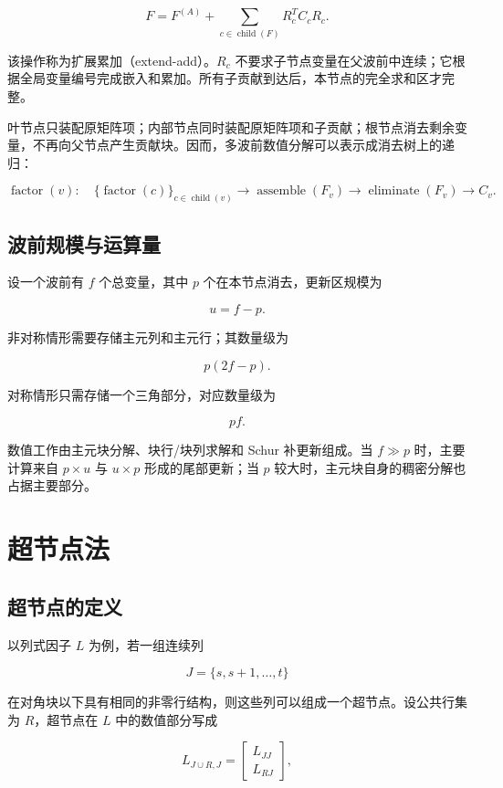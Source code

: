 \[
F=F^{(A)}+
\sum_{c\in\operatorname{child}(F)}R_c^TC_cR_c.
\]

该操作称为扩展累加（extend-add）。$R_c$ 不要求子节点变量在父波前中连续；它根据全局变量编号完成嵌入和累加。所有子贡献到达后，本节点的完全求和区才完整。

叶节点只装配原矩阵项；内部节点同时装配原矩阵项和子贡献；根节点消去剩余变量，不再向父节点产生贡献块。因而，多波前数值分解可以表示成消去树上的递归：

\[
\operatorname{factor}(v):
\quad
\bigl\{\operatorname{factor}(c)\bigr\}_{c\in\operatorname{child}(v)}
\longrightarrow
\operatorname{assemble}(F_v)
\longrightarrow
\operatorname{eliminate}(F_v)
\longrightarrow C_v.
\]

\subsection{波前规模与运算量}

设一个波前有 $f$ 个总变量，其中 $p$ 个在本节点消去，更新区规模为

\[
u=f-p.
\]

非对称情形需要存储主元列和主元行；其数量级为

\[
p(2f-p).
\]

对称情形只需存储一个三角部分，对应数量级为

\[
pf.
\]

数值工作由主元块分解、块行/块列求解和 Schur 补更新组成。当 $f\gg p$ 时，主要计算来自 $p\times u$ 与 $u\times p$ 形成的尾部更新；当 $p$ 较大时，主元块自身的稠密分解也占据主要部分。

\section{超节点法}

\subsection{超节点的定义}

以列式因子 $L$ 为例，若一组连续列

\[
J=\{s,s+1,\ldots,t\}
\]

在对角块以下具有相同的非零行结构，则这些列可以组成一个超节点。设公共行集为 $R$，超节点在 $L$ 中的数值部分写成

\[
L_{J\cup R,J}=
\begin{bmatrix}
L_{JJ}\\
L_{RJ}
\end{bmatrix},
\]

